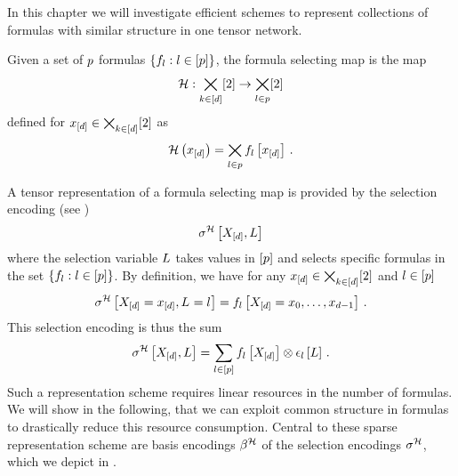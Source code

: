 \chapter{\chatextformulaSelection}\label{cha:formulaSelection}

In this chapter we will investigate efficient schemes to represent collections of formulas with similar structure in one tensor network.

\begin{definition}
    Given a set of $p$ formulas $\{f_{l} : l\in[p]\}$, the formula selecting map is the map
    \begin{align*}
        \mathcal{H} : \bigtimes_{k\in[d]}[2] \rightarrow \bigtimes_{l\in p} [2]
    \end{align*}
    defined for $x_{[d]}\in\bigtimes_{k\in[d]}[2]$ as
    \begin{align*}
        \mathcal{H}\left(x_{[d]}\right)
        = \bigtimes_{l\in p} f_{l}\left[x_{[d]}\right] \, .
    \end{align*}
\end{definition}

A tensor representation of a formula selecting map is provided by the selection encoding (see )
\begin{align*}
    \sigma^{\mathcal{H}}\left[X_{[d]},L\right]
\end{align*}
where the selection variable $L$ takes values in $[p]$ and selects specific formulas in the set $\{f_{l} : l\in[p]\}$.
By definition, we have for any $x_{[d]}\in\bigtimes_{k\in[d]}[2]$ and $l\in[p]$
\begin{align*}
    \sigma^{\mathcal{H}}\left[X_{[d]}=x_{[d]},L_{}=l_{}\right]
    =  f_{l}\left[X_{[d]}={x_{0},\ldots,x_{d-1}}\right] \, .
\end{align*}
This selection encoding is thus the sum
\begin{align*}
    \sigma^{\mathcal{H}}\left[X_{[d]},L\right]
    = \sum_{l\in[p]} f_{l}\left[X_{[d]}\right]
    \otimes \epsilon_{l}\left[L\right] \, .
\end{align*}
Such a representation scheme requires linear resources in the number of formulas.
We will show in the following, that we can exploit common structure in formulas to drastically reduce this resource consumption.
Central to these sparse representation scheme are basis encodings $\beta^{\mathcal{H}}$ of the selection encodings $\sigma^{\mathcal{H}}$, which we depict in .

